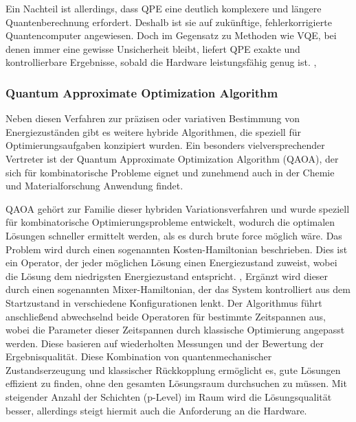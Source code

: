 Ein Nachteil ist allerdings, dass QPE eine deutlich komplexere und längere Quantenberechnung erfordert. Deshalb ist sie auf zukünftige, fehlerkorrigierte Quantencomputer angewiesen. Doch im Gegensatz zu Methoden wie VQE, bei denen immer eine gewisse Unsicherheit bleibt, liefert QPE exakte und kontrollierbare Ergebnisse, sobald die Hardware leistungsfähig genug ist. \citealp[7]{vonburgQuantumComputingEnhanced2021},\citealp[25]{mottaEmergingQuantumComputing2022}



\subsubsection*{Quantum Approximate Optimization Algorithm}

Neben diesen Verfahren zur präzisen oder variativen Bestimmung von Energiezuständen gibt es weitere hybride Algorithmen, die speziell für Optimierungsaufgaben konzipiert wurden. Ein besonders vielversprechender Vertreter ist der Quantum Approximate Optimization Algorithm (QAOA), der sich für kombinatorische Probleme eignet und zunehmend auch in der Chemie und Materialforschung Anwendung findet.

QAOA gehört zur Familie dieser hybriden Variationsverfahren und wurde speziell für kombinatorische Optimierungsprobleme entwickelt, wodurch die optimalen Lösungen schneller ermittelt werden, als es durch brute force möglich wäre. \citealp[3]{guoHarnessingQuantumPower2024} Das Problem wird durch einen sogenannten Kosten-Hamiltonian beschrieben. Dies ist ein Operator, der jeder möglichen Lösung einen Energiezustand zuweist, wobei die Lösung dem niedrigsten Energiezustand entspricht. \citealp[24]{mottaEmergingQuantumComputing2022}, \citealp[8]{guoHarnessingQuantumPower2024} Ergänzt wird dieser durch einen sogenannten Mixer-Hamiltonian, der das System kontrolliert aus dem Startzustand in verschiedene Konfigurationen lenkt. Der Algorithmus führt anschließend abwechselnd beide Operatoren für bestimmte Zeitspannen aus, wobei die Parameter dieser Zeitspannen durch klassische Optimierung angepasst werden. Diese basieren auf wiederholten Messungen und der Bewertung der Ergebnisqualität. \citealp[8]{guoHarnessingQuantumPower2024}
Diese Kombination von quantenmechanischer Zustandserzeugung und klassischer Rückkopplung ermöglicht es, gute Lösungen effizient zu finden, ohne den gesamten Lösungsraum durchsuchen zu müssen. Mit steigender Anzahl der Schichten (p-Level) im Raum wird die Lösungsqualität besser, allerdings steigt hiermit auch die Anforderung an die Hardware.

